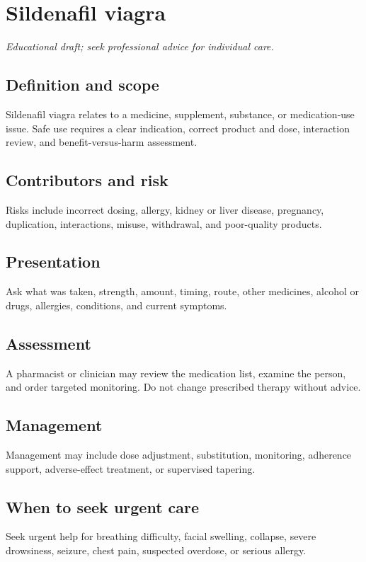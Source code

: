 \chapter{Sildenafil viagra}
\medskip
\noindent\textit{Educational draft; seek professional advice for individual care.}

\section*{Definition and scope}
Sildenafil viagra relates to a medicine, supplement, substance, or medication-use issue. Safe use requires a clear indication, correct product and dose, interaction review, and benefit-versus-harm assessment.

\section*{Contributors and risk}
Risks include incorrect dosing, allergy, kidney or liver disease, pregnancy, duplication, interactions, misuse, withdrawal, and poor-quality products.

\section*{Presentation}
Ask what was taken, strength, amount, timing, route, other medicines, alcohol or drugs, allergies, conditions, and current symptoms.

\section*{Assessment}
A pharmacist or clinician may review the medication list, examine the person, and order targeted monitoring. Do not change prescribed therapy without advice.

\section*{Management}
Management may include dose adjustment, substitution, monitoring, adherence support, adverse-effect treatment, or supervised tapering.

\section*{When to seek urgent care}
Seek urgent help for breathing difficulty, facial swelling, collapse, severe drowsiness, seizure, chest pain, suspected overdose, or serious allergy.

